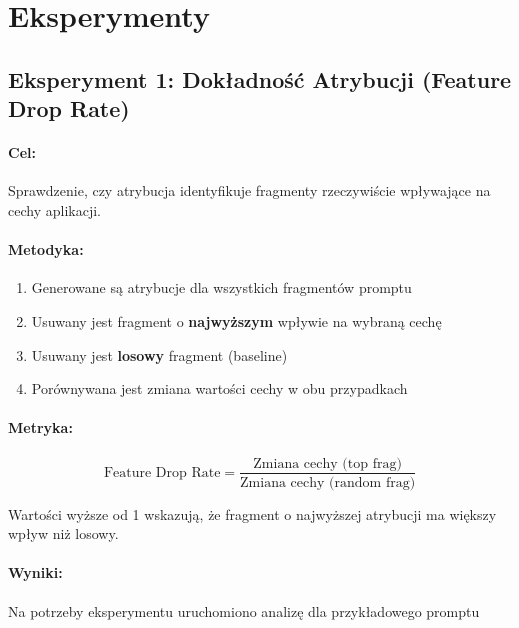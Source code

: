 \documentclass[12pt,a4paper]{article}
\begin{document}
\section{Eksperymenty}

\subsection{Eksperyment 1: Dokładność Atrybucji (Feature Drop Rate)}

\paragraph{Cel:} Sprawdzenie, czy atrybucja identyfikuje fragmenty rzeczywiście wpływające na cechy aplikacji.

\paragraph{Metodyka:}
\begin{enumerate}
    \item Generowane są atrybucje dla wszystkich fragmentów promptu
    \item Usuwany jest fragment o \textbf{najwyższym} wpływie na wybraną cechę
    \item Usuwany jest \textbf{losowy} fragment (baseline)
    \item Porównywana jest zmiana wartości cechy w obu przypadkach
\end{enumerate}

\paragraph{Metryka:}
\begin{equation}
\text{Feature Drop Rate} = \frac{\text{Zmiana cechy (top frag)}}{\text{Zmiana cechy (random frag)}}
\end{equation}

Wartości wyższe od 1 wskazują, że fragment o najwyższej atrybucji ma większy wpływ niż losowy.

\vspace{1cm}

\paragraph{Wyniki:}
Na potrzeby eksperymentu uruchomiono analizę dla przykładowego promptu
\end{document}
